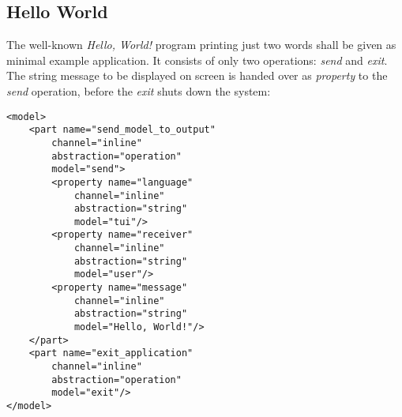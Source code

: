 %
%
%
%
%
%
%

\subsection{Hello World}
\label{hello_world_heading}

The well-known \emph{Hello, World!} program printing just two words shall be
given as minimal example application. It consists of only two operations:
\emph{send} and \emph{exit}. The string message to be displayed on screen is
handed over as \emph{property} to the \emph{send} operation, before the
\emph{exit} shuts down the system:

\begin{scriptsize}
    \begin{verbatim}
<model>
    <part name="send_model_to_output"
        channel="inline"
        abstraction="operation"
        model="send">
        <property name="language"
            channel="inline"
            abstraction="string"
            model="tui"/>
        <property name="receiver"
            channel="inline"
            abstraction="string"
            model="user"/>
        <property name="message"
            channel="inline"
            abstraction="string"
            model="Hello, World!"/>
    </part>
    <part name="exit_application"
        channel="inline"
        abstraction="operation"
        model="exit"/>
</model>
    \end{verbatim}
\end{scriptsize}
